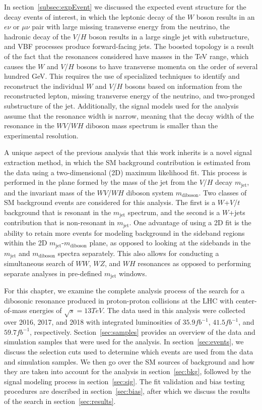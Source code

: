 In section~\ref{subsec:expEvent} we discussed the expected event structure for the decay events of interest, in which the leptonic decay of the $W$ boson results in an $e\nu$ or $\mu\nu$ pair with large missing transverse energy from the neutrino, the hadronic decay of the $V$/$H$ boson results in a large single jet with substructure, and VBF processes produce forward-facing jets.
The boosted topology is a result of the fact that the resonances considered have masses in the TeV range, which causes the $W$ and $V$/$H$ bosons to have transverse momenta on the order of several hundred GeV.
This requires the use of specialized techniques to identify and reconstruct the individual $W$ and $V$/$H$ bosons based on information from the reconstructed lepton, missing transverse energy of the neutrino, and two-pronged substructure of the jet.
Additionally, the signal models used for the analysis assume that the resonance width is narrow, meaning that the decay width of the resonance in the $WV$/$WH$ diboson mass spectrum is smaller than the experimental resolution.

A unique aspect of the previous analysis that this work inherits is a novel signal extraction method, in which the SM background contribution is estimated from the data using a two-dimensional (2D) maximum likelihood fit.
This process is performed in the plane formed by the mass of the jet from the $V$/$H$ decay $m_\mathrm{jet}$, and the invariant mass of the $WV$/$WH$ diboson system $m_\mathrm{diboson}$.
Two classes of SM background events are considered for this analysis.
The first is a $W$+$V$/$t$ background that is resonant in the $m_\mathrm{jet}$ spectrum, and the second is a $W$+jets contribution that is non-resonant in $m_\mathrm{jet}$.
One advantage of using a 2D fit is the ability to retain more events for modeling background in the sideband regions within the 2D $m_\mathrm{jet}$-$m_\mathrm{diboson}$ plane, as opposed to looking at the sidebands in the $m_\mathrm{jet}$ and $m_\mathrm{diboson}$ spectra separately.
This also allows for conducting a simultaneous search of $WW$, $WZ$, and $WH$ resonances as opposed to performing separate analyses in pre-defined $m_\mathrm{jet}$ windows.

For this chapter, we examine the complete analysis process of the search for a dibosonic resonance produced in proton-proton collisions at the LHC with center-of-mass energies of $\sqrt{s}=13\unit{TeV}$.
The data used in this analysis were collected over 2016, 2017, and 2018 with integrated luminosities of $35.9\unit{fb^{-1}}$, $41.5\unit{fb^{-1}}$, and $59.7\unit{fb^{-1}}$, respectively.
Section~\ref{sec:samples} provides an overview of the data and simulation samples that were used for the analysis.
In section~\ref{sec:events}, we discuss the selection cuts used to determine which events are used from the data and simulation samples.
We then go over the SM sources of background and how they are taken into account for the analysis in section~\ref{sec:bkg}, followed by the signal modeling process in section~\ref{sec:sig}.
The fit validation and bias testing procedures are described in section~\ref{sec:bias}, after which we discuss the results of the search in section~\ref{sec:results}.

